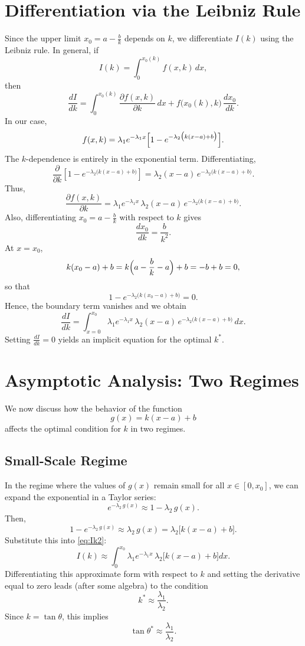 \section{Differentiation via the Leibniz Rule}

Since the upper limit \(x_0 = a - \frac{b}{k}\) depends on \(k\), we differentiate \( I(k) \) using the Leibniz rule. In general, if
\[
I(k) = \int_{0}^{x_0(k)} f(x,k) \, dx,
\]
then
\[
\frac{dI}{dk} = \int_{0}^{x_0(k)} \frac{\partial f(x,k)}{\partial k}\, dx + f\bigl(x_0(k), k\bigr) \, \frac{dx_0}{dk}.
\]
In our case, 
\[
f(x,k) = \lambda_1 e^{-\lambda_1 x} \Bigl[ 1 - e^{-\lambda_2 \bigl(k(x-a)+b\bigr)} \Bigr].
\]
The \(k\)-dependence is entirely in the exponential term. Differentiating,
\[
\frac{\partial}{\partial k} \left[ 1 - e^{-\lambda_2 \bigl(k(x-a)+b\bigr)} \right] = \lambda_2 (x-a) \, e^{-\lambda_2\bigl(k(x-a)+b\bigr)}.
\]
Thus,
\[
\frac{\partial f(x,k)}{\partial k} = \lambda_1 e^{-\lambda_1 x} \, \lambda_2 (x-a) \, e^{-\lambda_2\bigl(k(x-a)+b\bigr)}.
\]
Also, differentiating \( x_0 = a - \frac{b}{k} \) with respect to \( k \) gives
\[
\frac{dx_0}{dk} = \frac{b}{k^2}.
\]
At \(x=x_0\),
\[
k(x_0-a)+b = k\Bigl(a-\frac{b}{k}-a\Bigr)+b = -b+b = 0,
\]
so that
\[
1 - e^{-\lambda_2\bigl(k(x_0-a)+b\bigr)} = 0.
\]
Hence, the boundary term vanishes and we obtain
\begin{equation}\label{eq:dIdk}
  \frac{dI}{dk} = \int_{x=0}^{x_0} \lambda_1 e^{-\lambda_1 x}\,\lambda_2 (x-a)\, e^{-\lambda_2\bigl(k(x-a)+b\bigr)}\, dx.
\end{equation}
Setting \(\frac{dI}{dk} = 0\) yields an implicit equation for the optimal \( k^* \).

\section{Asymptotic Analysis: Two Regimes}

We now discuss how the behavior of the function 
\[
g(x) = k(x-a)+b
\]
affects the optimal condition for \(k\) in two regimes.

\subsection{Small-Scale Regime}

In the regime where the values of \(g(x)\) remain small for all \(x \in [0,x_0]\), we can expand the exponential in a Taylor series:
\[
e^{-\lambda_2\,g(x)} \approx 1 - \lambda_2\,g(x).
\]
Then,
\[
1 - e^{-\lambda_2\,g(x)} \approx \lambda_2\,g(x) = \lambda_2 \bigl[k(x-a)+b\bigr].
\]
Substitute this into \eqref{eq:Ik2}:
\[
I(k) \approx \int_{0}^{x_0} \lambda_1 e^{-\lambda_1 x}\, \lambda_2 \bigl[k(x-a)+b\bigr] dx.
\]
Differentiating this approximate form with respect to \(k\) and setting the derivative equal to zero leads (after some algebra) to the condition
\[
k^* \approx \frac{\lambda_1}{\lambda_2}.
\]
Since \(k = \tan\theta\), this implies
\[
\tan\theta^* \approx \frac{\lambda_1}{\lambda_2}.
\]

